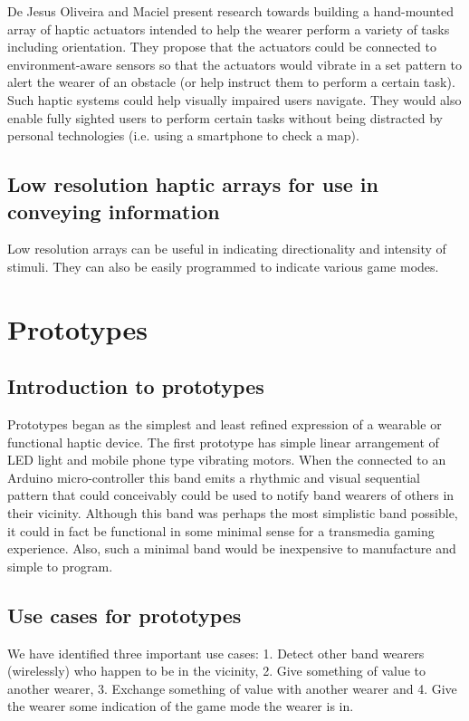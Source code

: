 \documentclass{chi-ext}
\begin{document}
De Jesus Oliveira and Maciel \cite{deusing} present research towards building a hand-mounted array of haptic actuators intended to help the wearer perform a variety of tasks including orientation. They propose that the actuators could be connected to environment-aware sensors so that the actuators would vibrate in a set pattern to alert the wearer of an obstacle (or help instruct them to perform a certain task). Such haptic systems could help visually impaired users navigate. They would also enable fully sighted users to perform certain tasks without being distracted by personal technologies (i.e. using a smartphone to check a map).

\subsection{Low resolution haptic arrays for use in conveying information}
Low resolution arrays can be useful in indicating directionality and intensity of stimuli. They can also be easily programmed to indicate various game modes. 

\section{Prototypes}

\subsection{Introduction to prototypes}
Prototypes began as the simplest and least refined expression of a wearable or functional haptic device. The first prototype has simple linear arrangement of LED light and mobile phone type vibrating motors. When the connected to an Arduino micro-controller this band emits a rhythmic and visual sequential pattern that could conceivably could be used to notify band wearers of others in their vicinity. Although this band was perhaps the most simplistic band possible, it could in fact be functional in some minimal sense for a transmedia gaming experience. Also, such a minimal band would be inexpensive to manufacture and simple to program. 

\subsection{Use cases for prototypes}
We have identified three important use cases: 1. Detect other band wearers (wirelessly) who happen to be in the vicinity, 2. Give something of value to another wearer, 3. Exchange something of value with another wearer and 4. Give the wearer some indication of the game mode the wearer is in.
\end{document}
